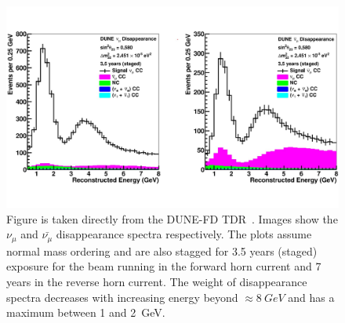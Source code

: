 \begin{figure}[]
\centering
\includegraphics[width=\textwidth]{images/tdr_muon_reconstruction_tdrv2.pdf}
\caption{Figure is taken directly from the DUNE-FD TDR~\citep{DUNE_FD_TDRv2_2020}.
Images show the $\nu_{\mu}$ and $\bar{\nu_{\mu}}$ disappearance spectra respectively.
The plots assume normal mass ordering and are also stagged for 3.5 years (staged) exposure for the beam running in the forward horn current and 7 years in the reverse horn current.
The weight of disappearance spectra decreases with increasing energy beyond $\approx 8~\unit{GeV}$ and has a maximum between 1 and 2~\unit{GeV}.
}
\end{figure}~\label{fig:muon_interaction}

